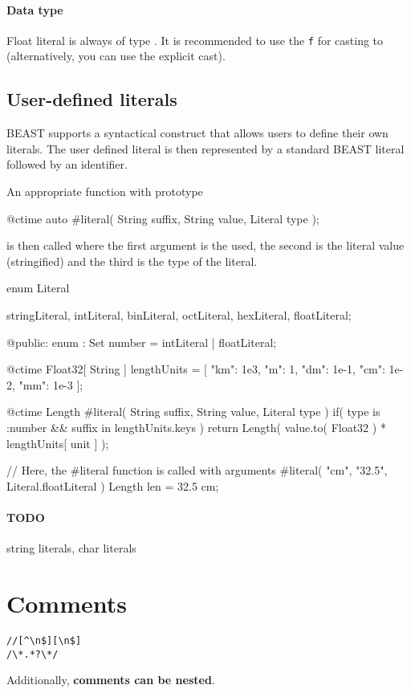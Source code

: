 \paragraph{Data type} Float literal is always of type . It is recommended to use the \verb|f| for casting to  (alternatively, you can use the explicit cast).

\subsection{User-defined literals} \label{userDefinedLiterals}
BEAST supports a syntactical construct that allows users to define their own literals. The user defined literal is then represented by a standard BEAST literal followed by an identifier.

An appropriate function with prototype
\begin{code}
@ctime auto #literal( String suffix, String value, Literal type );
\end{code}
is then called where the first argument is the  used, the second is the literal value (stringified) and the third is the type of the literal.

\begin{code}
enum Literal {
	stringLiteral,
	intLiteral,
	binLiteral,
	octLiteral,
	hexLiteral,
	floatLiteral;
	
@public:
	enum : Set {
		number = intLiteral | floatLiteral;	
	}
}
\end{code}

\begin{code}
@ctime Float32[ String ] lengthUnits = [
	"km": 1e3, "m": 1, "dm": 1e-1, "cm": 1e-2, "mm": 1e-3
];
	
@ctime Length #literal( String suffix, String value, Literal type )
	if( type is :number && suffix in lengthUnits.keys )
{
	return Length( value.to( Float32 ) * lengthUnits[ unit ] );
}

// Here, the #literal function is called with arguments #literal( "cm", "32.5", Literal.floatLiteral )
Length len = 32.5 cm;
\end{code}

\paragraph{TODO} string literals, char literals

\section{Comments}
\begin{grammar}
	 \verb|//[^\n$][\n$]| \\
	 \verb|/\*.*?\*/|
\end{grammar}
Additionally, \textbf{comments can be nested}.

